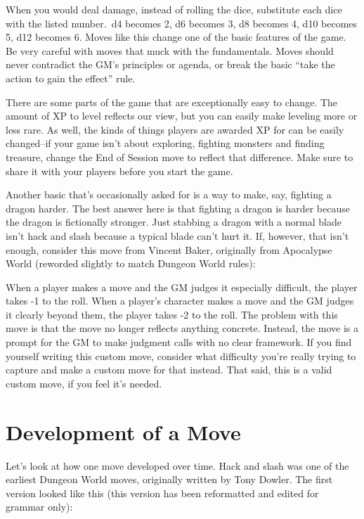 \HRule
When you would deal damage, instead of rolling the dice, substitute each dice with the listed number.\ d4 becomes 2, d6 becomes 3, d8 becomes 4, d10 becomes 5, d12 becomes 6.
\HRule
Moves like this change one of the basic features of the game. Be very careful with moves that muck with the fundamentals. Moves should never contradict the GM's principles or agenda, or break the basic ``take the action to gain the effect'' rule.


There are some parts of the game that are exceptionally easy to change. The amount of XP to level reflects our view, but you can easily make leveling more or less rare. As well, the kinds of things players are awarded XP for can be easily changed--if your game isn't about exploring, fighting monsters and finding treasure, change the End of Session move to reflect that difference. Make sure to share it with your players before you start the game.


Another basic that's occasionally asked for is a way to make, say, fighting a dragon harder. The best answer here is that fighting a dragon is harder because the dragon is fictionally stronger. Just stabbing a dragon with a normal blade isn't hack and slash because a typical blade can't hurt it. If, however, that isn't enough, consider this move from Vincent Baker, originally from Apocalypse World (reworded slightly to match Dungeon World rules):

\HRule
When a player makes a move and the GM judges it especially difficult, the player takes -1 to the roll. When a player's character makes a move and the GM judges it clearly beyond them, the player takes -2 to the roll.
\HRule
The problem with this move is that the move no longer reflects anything concrete. Instead, the move is a prompt for the GM to make judgment calls with no clear framework. If you find yourself writing this custom move, consider what difficulty you're really trying to capture and make a custom move for that instead. That said, this is a valid custom move, if you feel it's needed.
\section*{Development of a Move}


Let's look at how one move developed over time. Hack and slash was one of the earliest Dungeon World moves, originally written by Tony Dowler. The first version looked like this (this version has been reformatted and edited for grammar only):

